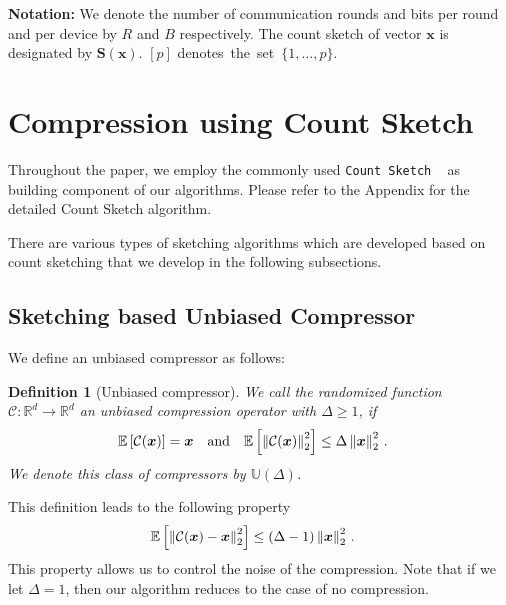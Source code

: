 \documentclass[sigconf, anonymous, review]{acmart}
\newtheorem{definition}{Definition}
\begin{document}
\noindent\textbf{Notation:} 
We denote the number of communication rounds and bits per round and per device by $R$ and $B$ respectively. 
The count sketch of vector $\boldsymbol{x}$ is designated by $\mathbf{S}(\boldsymbol{x})$. $[p]$ denotes~the~set~$\{1,\dots,p\}$.




\section{Compression using Count Sketch}\label{sec:compression}


Throughout the paper, we employ the commonly used \texttt{Count Sketch} ~\citep{DBLP:journals/tcs/CharikarCF04} as building component of our algorithms. 
Please refer to the Appendix for the detailed Count Sketch algorithm. 

There are various types of sketching algorithms which are developed based on count sketching that we develop in the following subsections. 





\subsection{Sketching based Unbiased Compressor}



We define an unbiased compressor as follows:
\begin{definition}[Unbiased compressor]\label{def:unbiased}
We call the randomized function $\mathcal{C}:\mathbb{R}^{d}\rightarrow\mathbb{R}^{d}$ an unbiased compression operator with $\Delta\geq 1$, if
\begin{align}\notag
\mathbb{E}\left[\mathcal{C}(\boldsymbol{x})\right]&=\boldsymbol{x}\nonumber \quad \textrm{and} \quad    \mathbb{E}\left[\left\|\mathcal{C}(\boldsymbol{x})\right\|^2_2\right] \leq \Delta\left\|\boldsymbol{x}\right\|^2_2\notag \, .
\end{align}
We denote this class of compressors by $\mathbb{U}(\Delta)$.
\end{definition}
This definition leads to the following property 
\begin{align}\notag
    \mathbb{E}\left[\left\|\mathcal{C}(\boldsymbol{x})-\boldsymbol{x}\right\|^2_2\right]&\leq \left(\Delta-1\right)\left\|\boldsymbol{x}\right\|^2_2\, .
\end{align}
This property allows us to control the noise of the compression.
Note that if we let $\Delta=1$, then our algorithm reduces to the case of no compression. 
\end{document}
